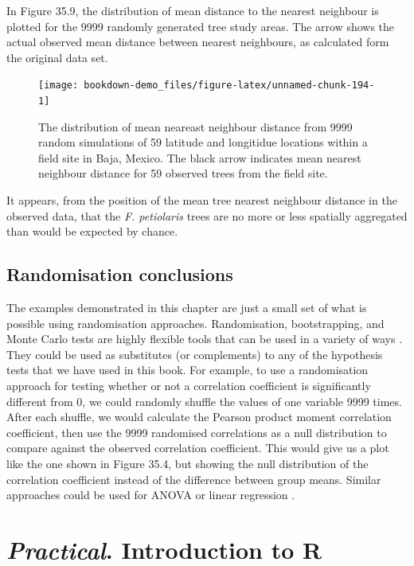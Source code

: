 \documentclass[
]{scrbook}
\begin{document}
In Figure 35.9, the distribution of mean distance to the nearest neighbour is plotted for the 9999 randomly generated tree study areas.
The arrow shows the actual observed mean distance between nearest neighbours, as calculated form the original data set.

\begin{figure}
\texttt{[image: bookdown-demo\_files/figure-latex/unnamed-chunk-194-1]} \caption{The distribution of mean neareast neighbour distance from 9999 random simulations of 59 latitude and longitidue locations within a field site in Baja, Mexico. The black arrow indicates mean nearest neighbour distance for 59 observed trees from the field site.}\label{fig:unnamed-chunk-194}
\end{figure}

It appears, from the position of the mean tree nearest neighbour distance in the observed data, that the \emph{F. petiolaris} trees are no more or less spatially aggregated than would be expected by chance.

\hypertarget{randomisation-conclusions}{%
\section{Randomisation conclusions}\label{randomisation-conclusions}}

The examples demonstrated in this chapter are just a small set of what is possible using randomisation approaches.
Randomisation, bootstrapping, and Monte Carlo tests are highly flexible tools that can be used in a variety of ways \citep{Manly2007}.
They could be used as substitutes (or complements) to any of the hypothesis tests that we have used in this book.
For example, to use a randomisation approach for testing whether or not a correlation coefficient is significantly different from 0, we could randomly shuffle the values of one variable 9999 times.
After each shuffle, we would calculate the Pearson product moment correlation coefficient, then use the 9999 randomised correlations as a null distribution to compare against the observed correlation coefficient.
This would give us a plot like the one shown in Figure 35.4, but showing the null distribution of the correlation coefficient instead of the difference between group means.
Similar approaches could be used for ANOVA or linear regression \citep{Manly2007}.

\hypertarget{Chapter_36}{%
\chapter{\texorpdfstring{\emph{Practical}. Introduction to R}{Practical. Introduction to R}}\label{Chapter_36}}
\end{document}

